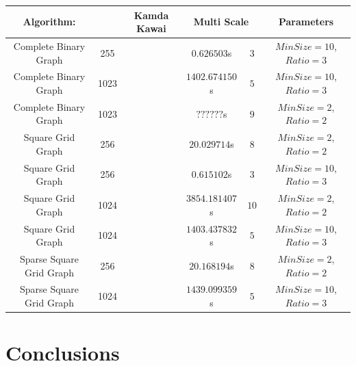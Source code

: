 \documentclass[12pt,a4paper]{article}
\begin{document}
\begin{table}[htb]

\begin{tabular}{|c|c||c|c|c|c|c|}
\hline
Algorithm: & & \multicolumn{2}{|c|}{Kamda Kawai} &  \multicolumn{2}{|c|}{Multi Scale} & Parameters \\
\hline
\hline 
Complete Binary Graph & 255  & & & $0.626503$s    & $3$ & $MinSize=10$, $Ratio=3$\\ 
\hline 
Complete Binary Graph & 1023 & & & $1402.674150$s & $5$ & $MinSize=10$, $Ratio=3$\\ 
\hline 
Complete Binary Graph & 1023 & & & $??????$s & $9$ & $MinSize=2$, $Ratio=2$\\ 
\hline \hline
Square Grid Graph     & 256 & & & $20.029714$s & $8$ & $MinSize=2$, $Ratio=2$\\ 
\hline
Square Grid Graph     & 256 & & & $0.615102$s & $3$ & $MinSize=10$, $Ratio=3$\\ 
\hline
Square Grid Graph     & 1024 & & & $3854.181407$s & $10$ & $MinSize=2$, $Ratio=2$\\ 
\hline
Square Grid Graph     & 1024 & & & $1403.437832$s & $5$ & $MinSize=10$, $Ratio=3$\\ 
\hline\hline
Sparse Square Grid Graph & 256 & & & $20.168194$s & $8$ & $MinSize=2$, $Ratio=2$\\ 
\hline
Sparse Square Grid Graph & 1024 & & & $1439.099359$s & $5$ & $MinSize=10$, $Ratio=3$\\ 

\hline 
\end{tabular} 
\end{table}
\FloatBarrier 

\section{Conclusions}



\end{document}
